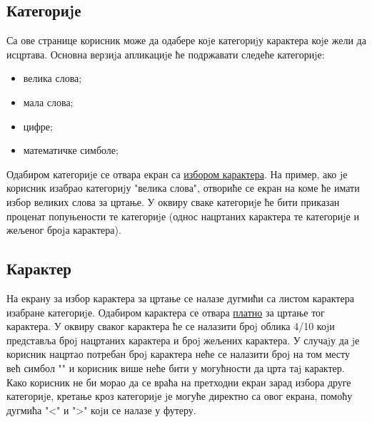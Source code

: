 \documentclass[a4paper]{article}
\begin{document}
\subsection{Категориjе}
\label{categories}
Са ове странице корисник може да одабере коjе категориjу карактера
коjе жели да исцртава. Основна верзиjа апликациjе ће подржавати следеће
категориjе:
\begin{itemize}
	\item велика слова;
	\item мала слова;
	\item цифре;
	\item математичке симболе;
\end{itemize}
Одабиром категориjе се отвара екран са \hyperref[character]{избором карактера}. На пример,
ако jе корисник изабрао категориjу "велика слова", отвориће се екран на
коме ће имати избор великих слова за цртање. У оквиру сваке категориjе
ће бити приказан проценат попуњености те категориjе (однос нацртаних
карактера те категориjе и жељеног броjа карактера).

\subsection{Карактер}
\label{character}
На екрану за избор карактера за цртање се налазе дугмићи са листом
карактера изабране категориjе. Одабиром карактера се отвара \hyperref[canvas]{платно} за
цртање тог карактера. У оквиру сваког карактера ће се налазити броj
облика 4/10 коjи представља броj нацртаних карактера и броj жељених
карактера. У случаjу да jе корисник нацртао потребан броj карактера неће
се налазити броj на том месту већ симбол "\checkmark" и корисник више неће бити у
могућности да црта таj карактер. Како корисник не би морао да се враћа на
претходни екран зарад избора друге категориjе, кретање кроз категориjе jе
могуће директно са овог екрана, помоћу дугмића "<" и ">" коjи се налазе
у футеру.
\end{document}
